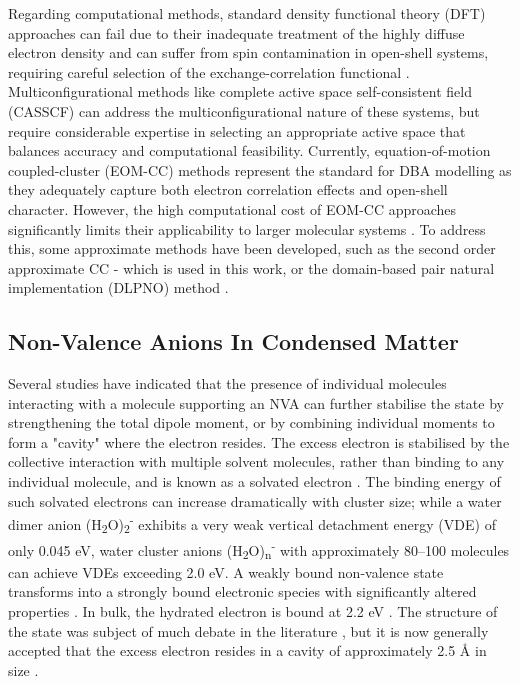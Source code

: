Regarding computational methods, standard density functional theory (DFT) approaches can fail due to their inadequate treatment of the highly diffuse electron density and can suffer from spin contamination in open-shell systems, requiring careful selection of the exchange-correlation functional \cite{thiam2023accurately}. Multiconfigurational methods like complete active space self-consistent field (CASSCF) can address the multiconfigurational nature of these systems, but require considerable expertise in selecting an appropriate active space that balances accuracy and computational feasibility. Currently, equation-of-motion coupled-cluster (EOM-CC) methods represent the standard for DBA modelling as they adequately capture both electron correlation effects and open-shell character. However, the high computational cost of EOM-CC approaches significantly limits their applicability to larger molecular systems \cite{herbert2015quantum,jordan2003theory}. To address this, some approximate methods have been developed, such as the second order approximate CC \cite{christiansen1995second}- which is used in this work, or the domain-based pair natural implementation (DLPNO) method \cite{haldar2020multilayer}.

\subsection{Non-Valence Anions In Condensed Matter}

Several studies have indicated that the presence of individual molecules interacting with a molecule supporting an NVA can further stabilise the state by strengthening the total dipole moment, or by combining individual moments to form a "cavity" where the electron resides. The excess electron is stabilised by the collective interaction with multiple solvent molecules, rather than binding to any individual molecule, and is known as a solvated electron \cite{jordan2003theory,herbert2015quantum,jalbout2001dipole,clarke2025role}. The binding energy of such solvated electrons can increase dramatically with cluster size; while a water dimer anion (H\textsubscript{2}O)\textsubscript{2}\textsuperscript{-} exhibits a very weak vertical detachment energy (VDE) of only 0.045 eV, water cluster anions (H\textsubscript{2}O)\textsubscript{n}\textsuperscript{-} with approximately 80--100 molecules can achieve VDEs exceeding 2.0 eV. A weakly bound non-valence state transforms into a strongly bound electronic species with significantly altered properties \cite{herbert2015quantum}. In bulk, the hydrated electron is bound at 2.2 eV \cite{jordan2003theory,herbert2017hydrated}. The structure of the state was subject of much debate in the literature \cite{herbert2017hydrated,jordan2003theory}, but it is now generally accepted that the excess electron resides in a cavity of approximately 2.5 \r{A} in size \cite{herbert2017hydrated}.

